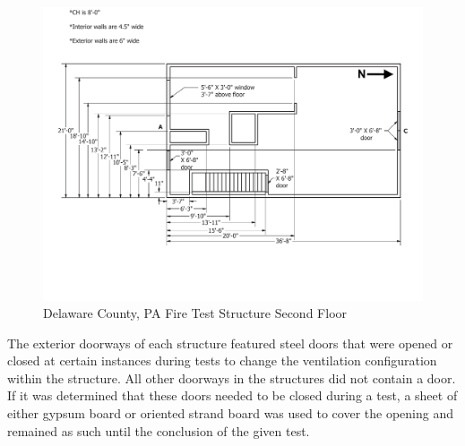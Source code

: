 \documentclass[12pt,oneside]{book}
\begin{document}
\begin{figure}[!ht]
	\centering
	\includegraphics[width=\columnwidth]{Figures/Air_Entrainment/West_Test_Structure_2nd_Floor_nodim.pdf}
	\caption{Delaware County, PA Fire Test Structure Second Floor}
	\label{fig:Delaware_County,_PA_Fire_Test_Structure_Second_Floor}
\end{figure}

The exterior doorways of each structure featured steel doors that were opened or closed at certain instances during tests to change the ventilation configuration within the structure. All other doorways in the structures did not contain a door. If it was determined that these doors needed to be closed during a test, a sheet of either gypsum board or oriented strand board was used to cover the opening and remained as such until the conclusion of the given test.


\end{document}
